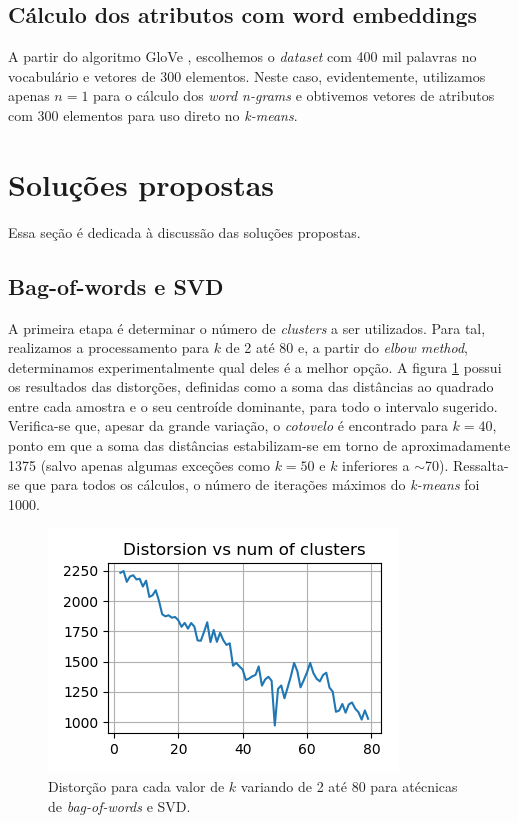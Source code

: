\documentclass[10pt,twocolumn,letterpaper]{article}
\begin{document}
\subsection {Cálculo dos atributos com word embeddings}

A partir do algoritmo GloVe \cite{pennington2014glove}, escolhemos o \textit{dataset} com 400 mil palavras no vocabulário e vetores de 300 elementos. Neste caso, evidentemente, utilizamos apenas \(n=1\) para o cálculo dos \textit{word n-grams} e obtivemos vetores de atributos com 300 elementos para uso direto no \textit{k-means}.

\section {Soluções propostas}

Essa seção é dedicada à discussão das soluções propostas.

\subsection{Bag-of-words e SVD}

A primeira etapa é determinar o número de \textit{clusters} a ser utilizados. Para tal, realizamos a processamento para \(k\) de 2 até 80 e, a partir do \textit{elbow method}, determinamos experimentalmente qual deles é a melhor opção. A figura \ref{img:kmeans_svd} possui os resultados das distorções, definidas como a soma das distâncias ao quadrado entre cada amostra e o seu centroíde dominante, para todo o intervalo sugerido. Verifica-se que, apesar da grande variação, o \textit{cotovelo} é encontrado para \(k = 40\), ponto em que a soma das distâncias estabilizam-se em torno de aproximadamente 1375 (salvo apenas algumas exceções como \(k = 50\) e \(k\) inferiores a $\sim$70). Ressalta-se que para todos os cálculos, o número de iterações máximos do \textit{k-means} foi 1000.

\begin{figure}
    \centering
    \includegraphics[width=\columnwidth]{figs/elbow_kmeans_tfidf_1-5_svd}
    \caption{Distorção para cada valor de \(k\) variando de 2 até 80 para atécnicas de \textit{bag-of-words} e SVD.}
    \label{img:kmeans_svd}
\end{figure}
\end{document}
